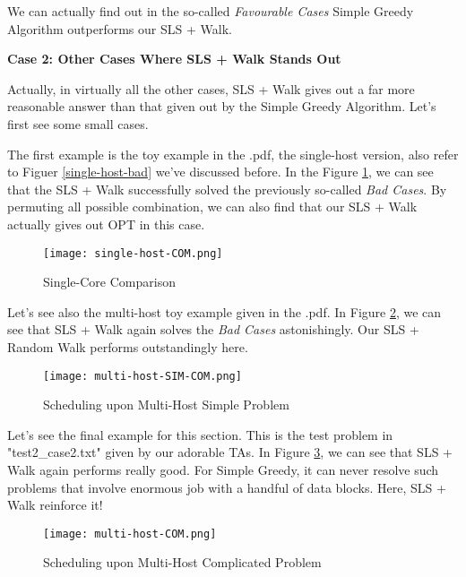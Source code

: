 \documentclass{article}
\begin{document}
    We can actually find out in the so-called \textit{Favourable Cases}  Simple Greedy Algorithm outperforms our SLS + Walk.
    
    
    \textbf{Case 2: Other Cases Where SLS + Walk Stands Out}
    
    Actually, in virtually all the other cases, SLS + Walk gives out a far more reasonable answer than that given out by the Simple Greedy Algorithm. Let's first see some small cases.
    
    The first example is the toy example in the .pdf, the single-host version, also refer to Figuer \ref{single-host-bad} we've discussed before. In the Figure \ref{single-host-COM}, we can see that the SLS + Walk successfully solved the previously so-called \textit{Bad Cases}. By permuting all possible combination, we can also find that our SLS + Walk actually gives out OPT in this case.
    
    \begin{figure}[H]
        \centering
        \texttt{[image: single-host-COM.png]}
        \caption{Single-Core Comparison}
        \label{single-host-COM}
    \end{figure}
    
    Let's see also the multi-host toy example given in the .pdf. In Figure \ref{multi-host-SIM-COM}, we can see that SLS + Walk again solves the \textit{Bad Cases} astonishingly. Our SLS + Random Walk performs outstandingly here.
    
    \begin{figure}[H]
        \centering
        \texttt{[image: multi-host-SIM-COM.png]}
        \caption{Scheduling upon Multi-Host Simple Problem}
        \label{multi-host-SIM-COM}
    \end{figure}
    
    Let's see the final example for this section. This is the test problem in "test2\_case2.txt" given by our adorable TAs. In Figure \ref{multi-host-COM}, we can see that SLS + Walk again performs really good. For Simple Greedy, it can never resolve such problems that involve enormous job with a handful of data blocks. Here, SLS + Walk reinforce it! 
    
    \begin{figure}[H]
        \centering
        \texttt{[image: multi-host-COM.png]}
        \caption{Scheduling upon Multi-Host Complicated Problem}
        \label{multi-host-COM}
    \end{figure}
    
\end{document}

